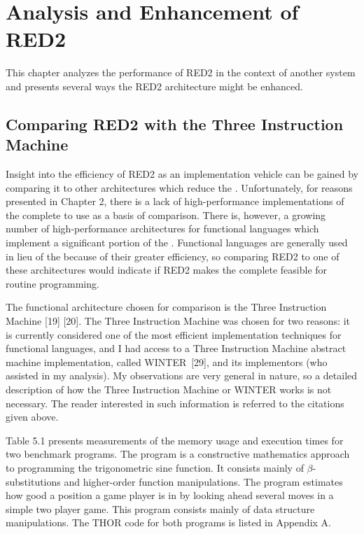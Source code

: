 \chapter{Analysis and Enhancement of RED2}

This chapter analyzes the performance of RED2 in the context of another
\lambdacalculus{} system and presents several ways the RED2 architecture might
be enhanced.

\section{Comparing RED2 with the Three Instruction Machine}

Insight into the efficiency of RED2 as an implementation vehicle can be gained
by comparing it to other architectures which reduce the \lambdacalculus{}.
Unfortunately, for reasons presented in Chapter 2, there is a lack of
high-performance implementations of the complete \lambdacalculus{} to use as a
basis of comparison. There is, however, a growing number of high-performance
architectures for functional languages which implement a significant portion of
the \lambdacalculus{}. Functional languages are generally used in lieu of the
\lambdacalculus{} because of their greater efficiency, so comparing RED2 to one
of these architectures would indicate if RED2 makes the complete
\lambdacalculus{} feasible for routine programming.

The functional architecture chosen for comparison is the Three Instruction
Machine [19] [20]. The Three Instruction Machine was chosen for two reasons: it
is currently considered one of the most efficient implementation techniques for
functional languages, and I had access to a Three Instruction Machine abstract
machine implementation, called WINTER~[29], and its implementors (who assisted
in my analysis). My observations are very general in nature, so a detailed
description of how the Three Instruction Machine or WINTER works is not
necessary. The reader interested in such information is referred to the
citations given above.

Table 5.1 presents measurements of the memory usage and execution times for two
benchmark programs. The  program is a constructive mathematics approach to
programming the trigonometric sine function. It consists mainly of
\(\beta\)-substitutions and higher-order function manipulations. The  program
estimates how good a position a game player is in by looking ahead several
moves in a simple two player game. This program consists mainly of data
structure manipulations. The THOR code for both programs is listed in Appendix
A.

